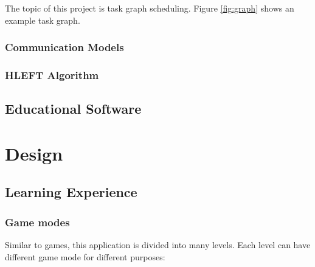 \documentclass[msc,deptreport, cs]{infthesis}
\begin{document}
The topic of this project is task graph scheduling. Figure \ref{fig:graph} shows an example task graph.

\subsection{Communication Models} \label{sec:comm}

\subsection{HLEFT Algorithm}

\section{Educational Software}

\chapter{Design}

\section{Learning Experience}

\subsection{Game modes}

Similar to games, this application is divided into many levels. Each level can have different game mode for different purposes:
\end{document}
